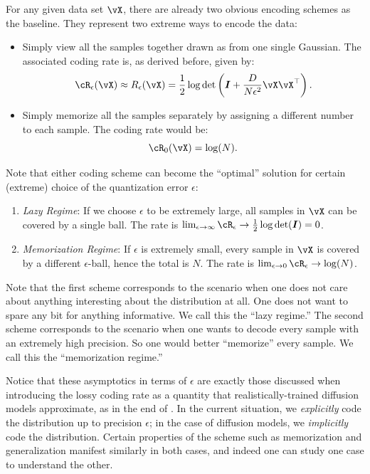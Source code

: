 \documentclass[../../book-main.tex]{subfiles}
\begin{document}
For any given data set $\vX$, there are already two obvious encoding
schemes as the baseline. They represent two extreme ways to encode the data:
\begin{itemize}
    \item Simply view all the samples together drawn as from one
        single Gaussian. The associated coding rate is, as derived
        before, given by:
        \begin{equation}
            \cR_{\epsilon}(\vX) \approx R_{\epsilon}(\vX) =
            \frac{1}{2} \log \det \left(\boldsymbol{I} +
            \frac{D}{N\epsilon^2} \vX\vX^\top \right).
        \end{equation}
    \item Simply memorize all the samples separately by assigning a
        different number to each sample. The coding rate would be:
        \begin{equation}
            \cR_0(\vX) = \log(N).
        \end{equation}
\end{itemize}

Note that either coding scheme can become the ``optimal'' solution
for certain (extreme) choice of the quantization error $\epsilon$:
\begin{enumerate}
    \item {\em Lazy Regime}: If we choose $\epsilon$ to be extremely
        large, all samples in $\vX$ can be covered by a single ball.
        The rate is  $\lim_{\epsilon \rightarrow \infty} \cR_\epsilon
        \rightarrow \frac{1}{2}\log\det (\boldsymbol{I}) = 0$.
    \item {\em Memorization Regime}: If $\epsilon$ is extremely
        small, every sample in $\vX$  is covered by a different
        $\epsilon$-ball, hence the total is $N$. The rate is
        $\lim_{\epsilon \rightarrow 0} \cR_\epsilon \rightarrow \log(N)$.
\end{enumerate}
Note that the first scheme corresponds to the scenario when one does
not care about anything interesting about the distribution at all.
One does not want to spare any bit for anything informative. We call
this the ``lazy regime.'' The second scheme corresponds to the
scenario when one wants to decode every sample with an extremely high
precision. So one would better ``memorize'' every sample. We call
this the ``memorization regime.''

Notice that these asymptotics in terms of \(\epsilon\) are exactly
those discussed when introducing the lossy coding rate as a quantity
that realistically-trained diffusion models approximate, as in the
end of . In the current situation, we
\textit{explicitly} code the distribution up to precision \(\epsilon\); in
the case of diffusion models, we \textit{implicitly} code the
distribution. Certain properties of the scheme such as memorization
and generalization manifest similarly in both cases, and indeed one
can study one case to understand the other.
\end{document}
